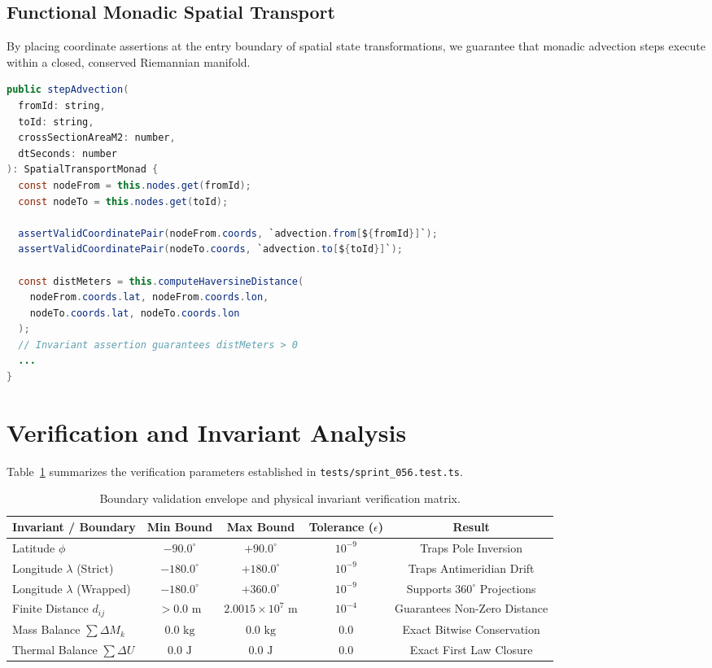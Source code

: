 \documentclass[11pt, a4paper]{article}
\begin{document}
\subsection{Functional Monadic Spatial Transport}

By placing coordinate assertions at the entry boundary of spatial state transformations, we guarantee that monadic advection steps execute within a closed, conserved Riemannian manifold.

\begin{lstlisting}[language=Java]
public stepAdvection(
  fromId: string,
  toId: string,
  crossSectionAreaM2: number,
  dtSeconds: number
): SpatialTransportMonad {
  const nodeFrom = this.nodes.get(fromId);
  const nodeTo = this.nodes.get(toId);
  
  assertValidCoordinatePair(nodeFrom.coords, `advection.from[${fromId}]`);
  assertValidCoordinatePair(nodeTo.coords, `advection.to[${toId}]`);

  const distMeters = this.computeHaversineDistance(
    nodeFrom.coords.lat, nodeFrom.coords.lon,
    nodeTo.coords.lat, nodeTo.coords.lon
  );
  // Invariant assertion guarantees distMeters > 0
  ...
}
\end{lstlisting}

\section{Verification and Invariant Analysis}

Table~\ref{tab:verification} summarizes the verification parameters established in \texttt{tests/sprint\_056.test.ts}.

\begin{table}[htbp]
\centering
\small
\begin{tabular}{lcccc}
\toprule
\textbf{Invariant / Boundary} & \textbf{Min Bound} & \textbf{Max Bound} & \textbf{Tolerance ($\epsilon$)} & \textbf{Result} \\
\midrule
Latitude $\phi$ & $-90.0^\circ$ & $+90.0^\circ$ & $10^{-9}$ & Traps Pole Inversion \\
Longitude $\lambda$ (Strict) & $-180.0^\circ$ & $+180.0^\circ$ & $10^{-9}$ & Traps Antimeridian Drift \\
Longitude $\lambda$ (Wrapped) & $-180.0^\circ$ & $+360.0^\circ$ & $10^{-9}$ & Supports $360^\circ$ Projections \\
Finite Distance $d_{ij}$ & $> 0.0\text{ m}$ & $2.0015 \times 10^7\text{ m}$ & $10^{-4}$ & Guarantees Non-Zero Distance \\
Mass Balance $\sum \Delta M_k$ & $0.0\text{ kg}$ & $0.0\text{ kg}$ & $0.0$ & Exact Bitwise Conservation \\
Thermal Balance $\sum \Delta U$ & $0.0\text{ J}$ & $0.0\text{ J}$ & $0.0$ & Exact First Law Closure \\
\bottomrule
\end{tabular}
\caption{Boundary validation envelope and physical invariant verification matrix.}
\label{tab:verification}
\end{table}
\end{document}
